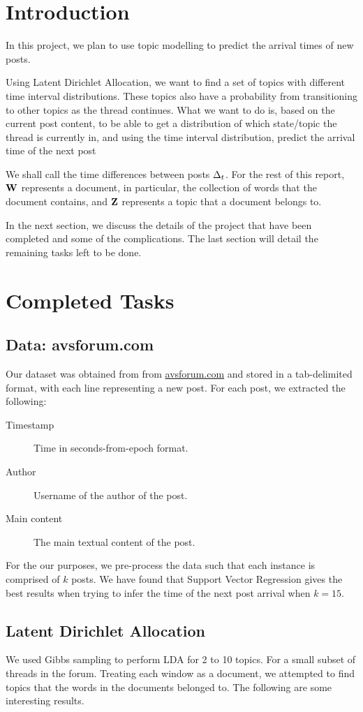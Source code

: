 \section{Introduction}
In this project, we plan to use topic modelling to predict the arrival times of 
new posts.

Using Latent Dirichlet Allocation, we want to find a set of topics with 
different time interval distributions. These topics also have a probability from 
transitioning to other topics as the thread continues. What we want to do is, 
based on the current post content, to be able to get a distribution of which 
state/topic the thread is currently in, and using the time interval 
distribution, predict the arrival time of the next post

We shall call the time differences between posts $\Delta_t$. For the rest of this 
report, $\mathbf{W}$ represents a document, in particular, the collection of words that 
the document contains, and $\mathbf{Z}$ represents a topic that a document belongs to.

In the next section, we discuss the details of the project that have been 
completed and some of the complications. The last section will detail the 
remaining tasks left to be done.
\section{Completed Tasks}
\subsection{Data: avsforum.com}
Our dataset was obtained from from \url{avsforum.com} and stored in a 
tab-delimited format, with each line representing a new post. For each post, we 
extracted the following:
\begin{description}
	\item[Timestamp] Time in seconds-from-epoch format.
	\item[Author] Username of the author of the post.
	\item[Main content] The main textual content of the post.
\end{description}
For the our purposes, we pre-process the data such that each instance is 
comprised of $k$ posts. We have found that Support Vector Regression gives the 
best results when trying to infer the time of the next post arrival when $k=15$.


\subsection{Latent Dirichlet Allocation}
We used Gibbs sampling to perform LDA for 2 to 10 topics. For a small subset of 
threads in the forum. Treating each window as a document, we attempted to find 
topics that the words in the documents belonged to. The following are some 
interesting results.

